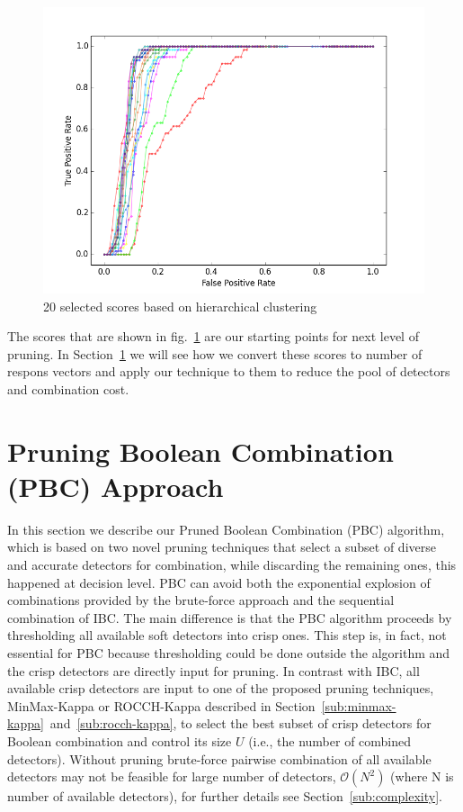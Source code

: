 \begin{figure}[H]
\centering
\includegraphics[width=1\linewidth]{figs/Dendrogram/soft-point}
\caption{20 selected scores based on hierarchical clustering }
\label{fig::20_scores}
\end{figure}


The scores that are shown in fig.~\ref{fig::20_scores} are our starting points for next level of pruning. In Section~\ref{sec:pbc} we will see how we convert these scores to number of respons vectors and apply our technique to them to reduce the pool of detectors and combination cost.


\section{Pruning Boolean Combination (PBC) Approach}
\label{sec:pbc}

In this section we describe our Pruned Boolean Combination (PBC) algorithm, which is based on two novel pruning techniques that select a subset of diverse and accurate detectors for combination, while discarding the remaining ones, this happened at decision level.
PBC can avoid both the exponential explosion of combinations provided by the brute-force approach and the sequential combination of IBC.
The main difference is that the PBC algorithm proceeds by thresholding all available soft detectors into crisp ones.
This step is, in fact, not essential for PBC because thresholding could be done outside the algorithm and the crisp detectors are directly input for pruning.
In contrast with IBC, all available crisp detectors are input to one of the proposed pruning techniques, MinMax-Kappa or ROCCH-Kappa described in Section~\ref{sub:minmax-kappa}~and~\ref{sub:rocch-kappa}, to select the best subset of crisp detectors for Boolean combination and control its size $U$ (i.e., the number of combined detectors).
Without pruning brute-force pairwise combination of all available detectors may not be feasible for large number of detectors, $\mathcal{O}({N^2})$ (where N is number of available detectors), for further details see Section~\ref{sub:complexity}.
 

